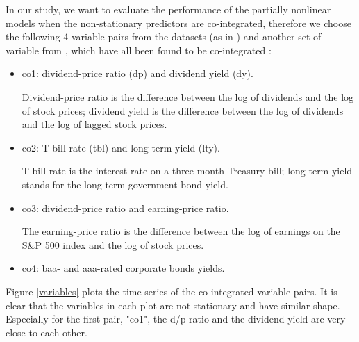 \documentclass[a4paper,12pt,times,numbered,print,index]{report}
\numberwithin{equation}{section}
\begin{document}
In our study, we want to evaluate the performance of the partially nonlinear models when the non-stationary predictors are co-integrated, therefore we choose the following 4 variable pairs from the \cite{welch2008comprehensive} datasets (as in \cite{zhou2018semiparametric}) and another set of variable from \cite{lettau2001consumption}, which have all been found to be co-integrated : 
\begin{itemize}
	\item co1: dividend-price ratio (dp) and dividend yield (dy). 
	
	Dividend-price ratio is the difference between the log of dividends and the log of stock prices; dividend yield is the difference between the log of dividends and the log of lagged stock prices.
	
	\item co2: T-bill rate (tbl) and long-term yield (lty).
	
	T-bill rate is the interest rate on a three-month Treasury bill; long-term yield stands for the long-term government bond yield.
	
	\item co3: dividend-price ratio and earning-price ratio.
	
	The earning-price ratio is the difference between the log of earnings on the S\&P 500 index and the log of stock prices.
	
	\item co4: baa- and aaa-rated corporate bonds yields. 
			
\end{itemize}

Figure \ref{variables} plots the time series of the co-integrated variable pairs. It is clear that the variables in each plot are not stationary and have similar shape. Especially for the first pair, "co1", the d/p ratio and the dividend yield are very close to each other. 
\end{document}
